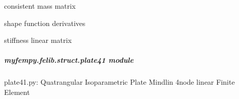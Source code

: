 \documentclass[letterpaper,10pt,english]{sphinxmanual}
\begin{document}
\begin{fulllineitems}

\begin{fulllineitems}
\label{\detokenize{myfempy.felib.struct:myfempy.felib.struct.plane41.Plane41.mass}}
\pysigstartsignatures
{}
\pysigstopsignatures
\sphinxAtStartPar
consistent mass matrix

\end{fulllineitems}


\begin{fulllineitems}
\label{\detokenize{myfempy.felib.struct:myfempy.felib.struct.plane41.Plane41.matriz_b}}
\pysigstartsignatures
{}
\pysigstopsignatures
\sphinxAtStartPar
shape function derivatives

\end{fulllineitems}


\begin{fulllineitems}
\label{\detokenize{myfempy.felib.struct:myfempy.felib.struct.plane41.Plane41.stiff_linear}}
\pysigstartsignatures
{}
\pysigstopsignatures
\sphinxAtStartPar
stiffness linear matrix

\end{fulllineitems}


\end{fulllineitems}



\subparagraph{myfempy.felib.struct.plate41 module}
\label{\detokenize{myfempy.felib.struct:module-myfempy.felib.struct.plate41}}\label{\detokenize{myfempy.felib.struct:myfempy-felib-struct-plate41-module}}
\sphinxAtStartPar
plate41.py: Quatrangular Isoparametric Plate Mindlin 4\sphinxhyphen{}node linear Finite Element
\end{document}
